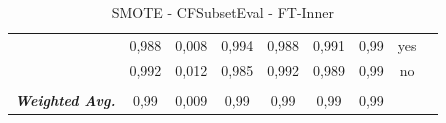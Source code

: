 \begin{table}[htbp]
{\begin{tabular}{rrrrrrrrr}
				\multicolumn{1}{c}{} & \multicolumn{1}{c}{0,988} & \multicolumn{1}{c}{0,008} & \multicolumn{1}{c}{0,994} & \multicolumn{1}{c}{0,988} & \multicolumn{1}{c}{0,991} & \multicolumn{1}{c}{0,99} & \multicolumn{1}{c}{yes} &  \\
				\multicolumn{1}{c}{} & \multicolumn{1}{c}{0,992} & \multicolumn{1}{c}{0,012} & \multicolumn{1}{c}{0,985} & \multicolumn{1}{c}{0,992} & \multicolumn{1}{c}{0,989} & \multicolumn{1}{c}{0,99} & \multicolumn{1}{c}{no} &  \\
				\multicolumn{1}{c}{} & \multicolumn{1}{c}{} & \multicolumn{1}{c}{} & \multicolumn{1}{c}{} & \multicolumn{1}{c}{} & \multicolumn{1}{c}{} & \multicolumn{1}{c}{} & \multicolumn{1}{c}{} &  \\
				\multicolumn{1}{c}{\textit{\textbf{Weighted Avg.}}} & \multicolumn{1}{c}{0,99} & \multicolumn{1}{c}{0,009} & \multicolumn{1}{c}{0,99} & \multicolumn{1}{c}{0,99} & \multicolumn{1}{c}{0,99} & \multicolumn{1}{c}{0,99} & \multicolumn{1}{c}{} &  \\
			\end{tabular}%
	}
	\label{tab:FTInnerExtendFiltered}%
	\caption{ SMOTE - CFSubsetEval - FT-Inner}
\end{table}%

